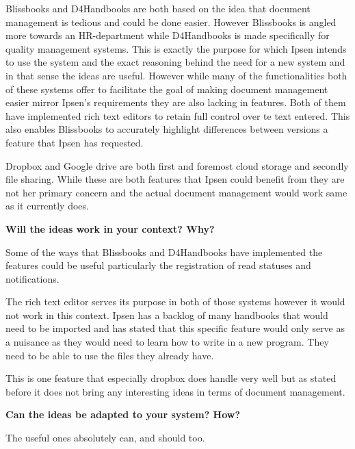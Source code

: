 Blissbooks and D4Handbooks are both based on the idea that document management is tedious and could be done easier.
However Blissbooks is angled more towards an HR-department while D4Handbooks is made specifically for quality management systems.
This is exactly the purpose for which Ipsen intends to use the system and the exact reasoning behind the need for a new system and in that sense the ideas are useful.
However while many of the functionalities both of these systems offer to facilitate the goal of making document management easier mirror Ipsen's requirements they are also lacking in features.
Both of them have implemented rich text editors to retain full control over te text entered. 
This also enables Blissbooks to accurately highlight differences between versions a feature that Ipsen has requested.

Dropbox and Google drive are both first and foremost cloud storage and secondly file sharing. 
While these are both features that Ipsen could benefit from they are not her primary concern and the actual document management would work same as it currently does.

\textbf{Will the ideas work in your context? Why?}

Some of the ways that Blissbooks and D4Handbooks have implemented the features could be useful particularly the registration of read statuses and notifications.

The rich text editor serves its purpose in both of those systems however it would not work in this context.
Ipsen has a backlog of many handbooks that would need to be imported and has stated that this specific feature would only serve as a nuisance as they would need to learn how to write in a new program.
They need to be able to use the files they already have.

This is one feature that especially dropbox does handle very well but as stated before it does not bring any interesting ideas in terms of document management.

\textbf{Can the ideas be adapted to your system? How?}

The useful ones absolutely can, and should too.
